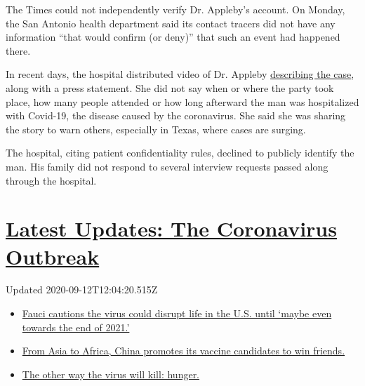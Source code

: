 The Times could not independently verify Dr. Appleby's account. On
Monday, the San Antonio health department said its contact tracers did
not have any information ``that would confirm (or deny)'' that such an
event had happened there.

In recent days, the hospital distributed video of Dr. Appleby
\href{https://abcnews.go.com/US/30-year-man-dies-attending-covid-party-thinking/}{describing
the case}, along with a press statement. She did not say when or where
the party took place, how many people attended or how long afterward the
man was hospitalized with Covid-19, the disease caused by the
coronavirus. She said she was sharing the story to warn others,
especially in Texas, where cases are surging.

The hospital, citing patient confidentiality rules, declined to publicly
identify the man. His family did not respond to several interview
requests passed along through the hospital.

\hypertarget{latest-updates-the-coronavirus-outbreak}{%
\section{\texorpdfstring{\href{https://www.nytimes3xbfgragh.onion/2020/09/11/world/covid-19-coronavirus.html?action=click\&pgtype=Article\&state=default\&region=MAIN_CONTENT_1\&context=storylines_live_updates}{Latest
Updates: The Coronavirus
Outbreak}}{Latest Updates: The Coronavirus Outbreak}}\label{latest-updates-the-coronavirus-outbreak}}

Updated 2020-09-12T12:04:20.515Z

\begin{itemize}
\tightlist
\item
  \href{https://www.nytimes3xbfgragh.onion/2020/09/11/world/covid-19-coronavirus.html?action=click\&pgtype=Article\&state=default\&region=MAIN_CONTENT_1\&context=storylines_live_updates\#link-dfb8a16}{Fauci
  cautions the virus could disrupt life in the U.S. until `maybe even
  towards the end of 2021.'}
\item
  \href{https://www.nytimes3xbfgragh.onion/2020/09/11/world/covid-19-coronavirus.html?action=click\&pgtype=Article\&state=default\&region=MAIN_CONTENT_1\&context=storylines_live_updates\#link-7104d154}{From
  Asia to Africa, China promotes its vaccine candidates to win friends.}
\item
  \href{https://www.nytimes3xbfgragh.onion/2020/09/11/world/covid-19-coronavirus.html?action=click\&pgtype=Article\&state=default\&region=MAIN_CONTENT_1\&context=storylines_live_updates\#link-393ad215}{The
  other way the virus will kill: hunger.}
\end{itemize}

